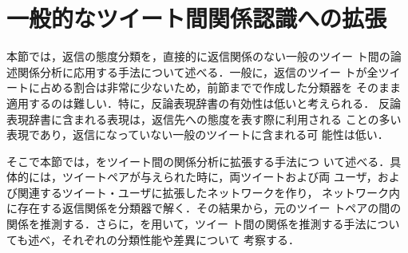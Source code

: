 \documentclass[japanese]{jnlp_1.4}
\newcommand{\addspan}[1]{}
\begin{document}
\addspan{
最後に，複合的な反論については，基本的な特徴のみで比較的よく識別できており，
反論表現の利用によりさらに性能が向上している．
これは，複合的な反論の中でも発言者への反論部分から特有の表現をとらえているためである．
基本的な特徴のみでよく識別できている理由としては，複合的な反論はある程度の長さがあり，
また定型的な文章で書かれていることが多く，それらに共通する有効な素性が抽出されやすいためと考えられる．
}


\section{一般的なツイート間関係認識への拡張}

本節では，\addspan{返信に限らない全てのツイート間の関係認識を行うことを考える．
その際，前節までで述べた}返信の態度分類を，直接的に返信関係のない一般のツイー
ト間の論述関係分析に応用する手法について述べる．一般に，返信のツイー
トが全ツイートに占める割合は非常に少ないため，前節までで作成した分類器を
そのまま適用するのは難しい．特に，反論表現辞書の有効性は低いと考えられる．
反論表現辞書に含まれる表現は，返信先への態度を表す際に利用される
ことの多い表現であり，返信になっていない一般のツイートに含まれる可
能性は低い．

\addspan{
返信の関係にない一般のツイート間に対して4クラスの分類を行うには，その言語
的な内容を利用することが考えられる．例えば，ツイート間の反論関係は，含意
関係認識課題~\cite{Dagan_2005}における文間の矛盾関係
 (RTE3~\cite{GiampiccoloRTE32007}) に相当する．文間の矛盾関係の認識に取り
組んだMarneffeら~\cite{MarneffeIdentifying2011}は，RTE3のテストデータに対
して精度22.95\%，再現率19.44\%を達成した．また，日本語を対象とした場合，
NTCIR9-RITE~\cite{ShimaRITE12011}およびNTCIR10-RITE2において，矛盾関係を
含む含意認識課題であるMC (multi class)タスクが取り扱われており，RITE2の
フォーマルランにおける矛盾関係認識性能は，精度52.17\%，再現率19.67\%が最
高性能であった\footnote{http://www.cl.ecei.tohoku.ac.jp/rite2/doku.php?id=wiki:results}
．これらの認識性能が示す通り，言語的な内容に基づく文間の矛盾関係の認識は
容易ではない．
}


そこで本節では，\addspan{返信態度の分類器}をツイート間の関係分析に拡張する手法につ
いて述べる．具体的には，ツイートペアが与えられた時に，両ツイートおよび両
ユーザ，および関連するツイート・ユーザに拡張したネットワークを作り，
ネットワーク内に存在する返信関係を分類器で解く．その結果から，元のツイー
トペアの間の関係を推測する．さらに，\addspan{後述する文間関係認識}を用いて，ツイー
ト間の関係を推測する手法についても述べ，それぞれの分類性能や差異について
考察する．
\end{document}
